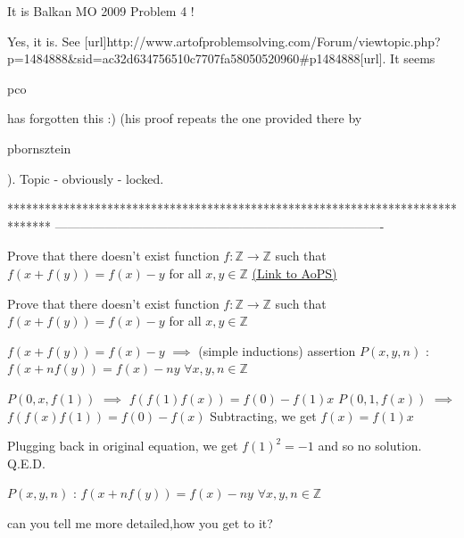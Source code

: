 \begin{solution}
	\begin{tcolorbox}It is Balkan MO 2009 Problem 4 !\end{tcolorbox}
Yes, it is. See [url]http://www.artofproblemsolving.com/Forum/viewtopic.php?p=1484888&sid=ac32d634756510c7707fa58050520960#p1484888[\/url]. 
It seems\begin{bolded} pco \end{bolded}has forgotten this  :) (his proof repeats the one provided there by\begin{bolded} pbornsztein\end{bolded}). Topic - obviously - locked.
\end{solution}
*******************************************************************************
-------------------------------------------------------------------------------

\begin{problem}
	Prove that there doesn't exist function $f : \mathbb{Z} \rightarrow \mathbb{Z}$ such that $f(x+f(y))=f(x)-y$ for all $x,y\in \mathbb{Z}$
	\flushright \href{https://artofproblemsolving.com/community/c6h612894}{(Link to AoPS)}
\end{problem}



\begin{solution}
	\begin{tcolorbox}Prove that there doesn't exist function $f : \mathbb{Z} \rightarrow \mathbb{Z}$ such that $f(x+f(y))=f(x)-y$ for all $x,y\in \mathbb{Z}$\end{tcolorbox}
$f(x+f(y))=f(x)-y$ $\implies$ (simple inductions) assertion $P(x,y,n)$ : $f(x+nf(y))=f(x)-ny$ $\forall x,y,n\in\mathbb Z$

$P(0,x,f(1))$ $\implies$ $f(f(1)f(x))=f(0)-f(1)x$
$P(0,1,f(x))$ $\implies$ $f(f(x)f(1))=f(0)-f(x)$
Subtracting, we get $f(x)=f(1)x$

Plugging back in original equation, we get $f(1)^2=-1$ and so no solution.
Q.E.D.
\end{solution}



\begin{solution}
	\begin{tcolorbox}
 $P(x,y,n)$ : $f(x+nf(y))=f(x)-ny$ $\forall x,y,n\in\mathbb Z$
\end{tcolorbox}
can you tell me more detailed,how you get to it?
\end{solution}



